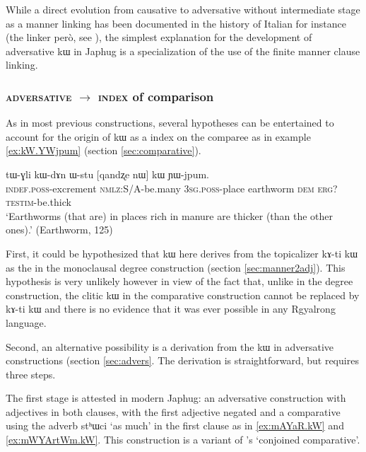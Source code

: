 \documentclass[oldfontcommands,oneside,a4paper,11pt]{article}
\newcommand{\ipa}[1]{{\phon #1}} %
\begin{document}
 While a direct evolution from causative to adversative without intermediate stage as a manner linking has been documented in the history of Italian for instance (the linker \ipa{però}, see  \citealt{mauri12adversative}), the simplest explanation for the development of adversative \ipa{kɯ} in Japhug is a specialization of the use of the finite manner clause linking.
 
 
 
  \subsubsection{\textsc{adversative} $\rightarrow$ \textsc{index} of comparison}
  As in most previous constructions, several hypotheses can be entertained to account for the origin of \ipa{kɯ} as a index on the comparee as in example \ref{ex:kW.YWjpum}  (section \ref{sec:comparative}).
  
        \begin{exe}
  \ex  \label{ex:kW.YWjpum}  
  \gll 
  \ipa{tɯ-ɣli} 	\ipa{kɯ-dɤn} 	\ipa{ɯ-stu} 	[\ipa{qandʐe} 	\ipa{nɯ}] 	\ipa{kɯ} 	\ipa{ɲɯ-jpum.} \\
  \textsc{indef.poss}-excrement \textsc{nmlz}:S/A-be.many \textsc{3sg.poss}-place earthworm \textsc{dem} \textsc{erg?} \textsc{testim}-be.thick   \\
  \glt `Earthworms (that are) in places rich in manure are thicker (than the other ones).'
   (Earthworm, 125)
   \end{exe} 

  First, it could be hypothesized that \ipa{kɯ} here derives from the topicalizer \ipa{kɤ-ti kɯ}  as the in the monoclausal degree construction (section \ref{sec:manner2adj}). This hypothesis is very unlikely however in view of the fact that, unlike in the degree construction, the clitic \ipa{kɯ} in the comparative construction cannot be replaced by \ipa{kɤ-ti kɯ} and there is no evidence that it was ever  possible in any Rgyalrong language.
  
  
Second, an alternative possibility is a derivation from the \ipa{kɯ} in adversative constructions (section \ref{sec:advers}. The derivation is straightforward, but requires three steps.

The first stage is attested in modern Japhug: an adversative construction with   adjectives in both  clauses, with the first adjective   negated and a comparative using the adverb \ipa{stʰɯci} `as much' in the first clause as in \ref{ex:mAYaR.kW} and \ref{ex:mWYArtWm.kW}.  This construction is a variant of \citet{stassen11comparative}'s `conjoined comparative'.
\end{document}
